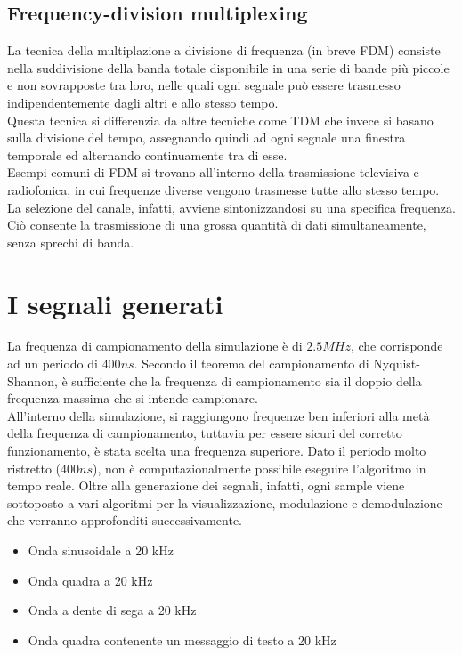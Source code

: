 \documentclass{article}
\begin{document}
\subsection{Frequency-division multiplexing}
La tecnica della multiplazione a divisione di frequenza (in breve FDM) consiste nella suddivisione della banda totale disponibile
in una serie di bande più piccole e non sovrapposte tra loro, nelle quali ogni segnale può essere trasmesso indipendentemente
dagli altri e allo stesso tempo.\\
Questa tecnica si differenzia da altre tecniche come TDM che invece si basano sulla divisione del tempo, assegnando quindi
ad ogni segnale una finestra temporale ed alternando continuamente tra di esse.\\
Esempi comuni di FDM si trovano all'interno della trasmissione televisiva e radiofonica, in cui frequenze diverse vengono
trasmesse tutte allo stesso tempo. La selezione del canale, infatti, avviene sintonizzandosi su una specifica frequenza.
Ciò consente la trasmissione di una grossa quantità di dati simultaneamente, senza sprechi di banda.

\section{I segnali generati}
La frequenza di campionamento della simulazione è di $2.5 MHz$, che corrisponde ad un periodo di $400 ns$. Secondo il teorema
del campionamento di Nyquist-Shannon, è sufficiente che la frequenza di campionamento sia il doppio della frequenza massima
che si intende campionare.\\
All'interno della simulazione, si raggiungono frequenze ben inferiori alla metà della frequenza di campionamento, tuttavia
per essere sicuri del corretto funzionamento, è stata scelta una frequenza superiore. Dato il periodo molto ristretto ($400 ns$),
non è computazionalmente possibile eseguire l'algoritmo in tempo reale. Oltre alla generazione dei segnali, infatti, ogni
sample viene sottoposto a vari algoritmi per la visualizzazione, modulazione e demodulazione che verranno approfonditi
successivamente.

\begin{itemize}
    \item Onda sinusoidale a 20 kHz
    \item Onda quadra a 20 kHz
    \item Onda a dente di sega a 20 kHz
    \item Onda quadra contenente un messaggio di testo a 20 kHz
\end{itemize}
\end{document}
